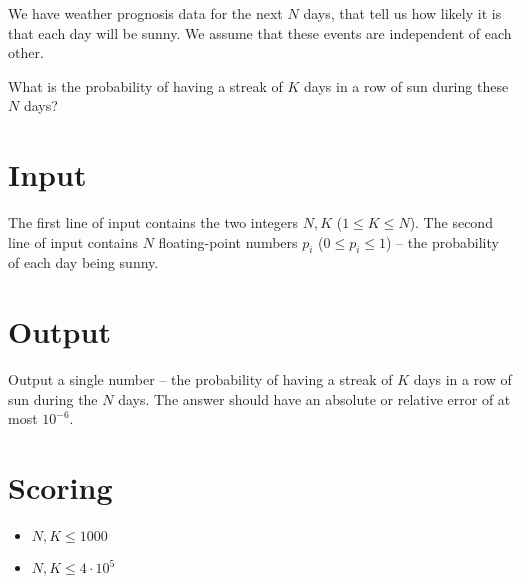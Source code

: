 
We have weather prognosis data for the next $N$ days, that
tell us how likely it is that each day will be sunny.
We assume that these events are independent of each other.

What is the probability of having a streak of $K$ days in a row
of sun during these $N$ days?

\section*{Input}
The first line of input contains the two integers $N, K$ ($1 \le K \le N$).
The second line of input contains $N$ floating-point numbers $p_i$ ($0 \le p_i \le 1$) --
the probability of each day being sunny.

\section*{Output}
Output a single number -- the probability of having a streak of $K$ days in a row
of sun during the $N$ days.
The answer should have an absolute or relative error of at most $10^{-6}$.

\section*{Scoring}
\begin{itemize}
  \item $N, K \le 1000$
  \item $N, K \le 4 \cdot 10^5$
\end{itemize}
